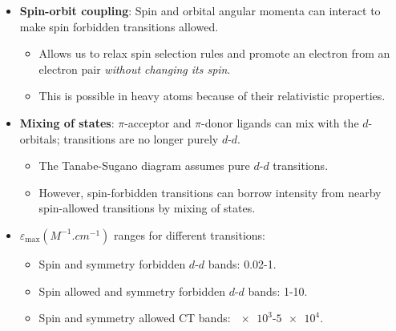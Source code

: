 \documentclass[../notes.tex]{subfiles}
\begin{document}
\begin{itemize}
\begin{itemize}
    \end{itemize}
    \item \textbf{Spin-orbit coupling}: Spin and orbital angular momenta can interact to make spin forbidden transitions allowed.
    \begin{itemize}
        \item Allows us to relax spin selection rules and promote an electron from an electron pair \emph{without changing its spin}.
        \item This is possible in heavy atoms because of their relativistic properties.
    \end{itemize}
    \item \textbf{Mixing of states}: $\pi$-acceptor and $\pi$-donor ligands can mix with the $d$-orbitals; transitions are no longer purely $d$-$d$.
    \begin{itemize}
        \item The Tanabe-Sugano diagram assumes pure $d$-$d$ transitions.
        \item However, spin-forbidden transitions can borrow intensity from nearby spin-allowed transitions by mixing of states.
    \end{itemize}
    \item $\varepsilon_\text{max}(\si{M^{-1}.cm^{-1}})$ ranges for different transitions:
    \begin{itemize}
        \item Spin and symmetry forbidden $d$-$d$ bands: 0.02-1.
        \item Spin allowed and symmetry forbidden $d$-$d$ bands: 1-10.
        \item Spin and symmetry allowed CT bands: $\num{e3}$-$\num{5e4}$.
    \end{itemize}
\end{itemize}
\end{document}
